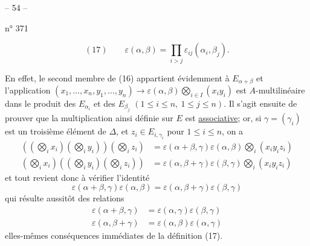 

\begin{center}-- 54 --\end{center}
\hfill n° 371

\[
(17)\qquad \varepsilon(\alpha,\beta)=\prod_{i>j}\varepsilon_{ij}(\alpha_i,\beta_j).
\]

En effet, le second membre de (16) appartient évidemment à $E_{\alpha+\beta}$ et l'application $(x_1,\ldots,x_n,y_1,\ldots,y_n)\longrightarrow\varepsilon(\alpha,\beta)\bigotimes_{i\in I}(x_i y_i)$ est $A$-multilinéaire dans le produit des $E_{\alpha_i}$ et des $E_{\beta_j}$ $(1\leq i\leq n,\ 1\leq j\leq n)$. Il s'agit ensuite de prouver que la multiplication ainsi définie sur $E$ est \uline{associative}; or, si $\gamma=(\gamma_i)$ est un troisième élément de $\Delta$, et $z_i\in E_{i,\gamma_i}$ pour $1\leq i\leq n$, on a
\[
\begin{aligned}
((\bigotimes_i x_i)(\bigotimes_i y_i))(\bigotimes_i z_i)&=\varepsilon(\alpha+\beta,\gamma)\varepsilon(\alpha,\beta)\bigotimes_i(x_i y_i z_i)\\
(\bigotimes_i x_i)((\bigotimes_i y_i)(\bigotimes_i z_i))&=\varepsilon(\alpha,\beta+\gamma)\varepsilon(\beta,\gamma)\bigotimes_i(x_i y_i z_i)
\end{aligned}
\]
et tout revient donc à vérifier l'identité
\[
\varepsilon(\alpha+\beta,\gamma)\varepsilon(\alpha,\beta)=\varepsilon(\alpha,\beta+\gamma)\varepsilon(\beta,\gamma)
\]
qui résulte aussitôt des relations
\[
\begin{aligned}
\varepsilon(\alpha+\beta,\gamma)&=\varepsilon(\alpha,\gamma)\varepsilon(\beta,\gamma)\\
\varepsilon(\alpha,\beta+\gamma)&=\varepsilon(\alpha,\beta)\varepsilon(\alpha,\gamma)
\end{aligned}
\]
elles-mêmes conséquences immédiates de la définition (17).

